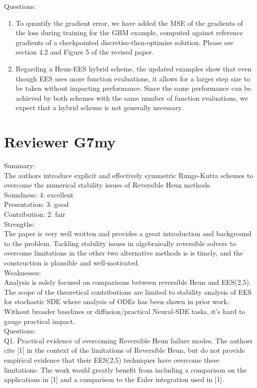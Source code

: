 \documentclass{article}
\begin{document}
Questions:
\begin{enumerate}
    \item To quantify the gradient error, we have added the MSE of the gradients of the loss during training for the GBM example, computed against reference gradients of a checkpointed discretise-then-optimise solution. Please see section 4.2 and Figure 5 of the revised paper.
    \item Regarding a Heun-EES hybrid scheme, the updated examples show that even though EES uses more function evaluations, it allows for a larger step size to be taken without impacting performance.  Since the same performance can be achieved by both schemes with the same number of function evaluations, we expect that a hybrid scheme is not generally necessary.
\end{enumerate}


\section{Reviewer G7my}

Summary:\\
The authors introduce explicit and effectively symmetric Runge-Kutta schemes to overcome the numerical stability issues of Reversible Heun methods.\\

Soundness: 4: excellent\\
Presentation: 3: good\\
Contribution: 2: fair\\
Strengths:\\
The paper is very well written and provides a great introduction and background to the problem. Tackling stability issues in algebraically reversible solvers to overcome limitations in the other two alternative methods is is timely, and the construction is plausible and well-motivated.\\

Weaknesses:\\
Analysis is solely focused on comparisons between reversible Heun and EES(2,5). The scope of the theoretical contributions are limited to stability analysis of EES for stochastic SDE where analysis of ODEs has been shown in prior work. Without broader baselines or diffusion/practical Neural-SDE tasks, it’s hard to gauge practical impact.\\

Questions:\\
Q1. Practical evidence of overcoming Reversible Heun failure modes. The authors cite [1] in the context of the limitations of Reversible Heun, but do not provide empirical evidence that their EES(2,5) techniques have overcome these limitations. The work would greatly benefit from including a comparison on the applications in [1] and a comparison to the Euler integration used in [1].\\
\end{document}
